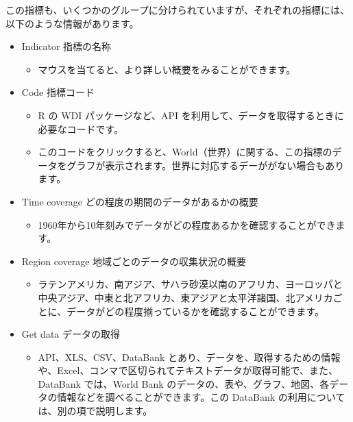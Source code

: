 \documentclass[
  xelatex, ja=standard]{bxjsbook}
\providecommand{\tightlist}{%
  \setlength{\itemsep}{0pt}\setlength{\parskip}{0pt}}
\theoremstyle{definition}
\theoremstyle{definition}
\theoremstyle{definition}
\theoremstyle{definition}
\theoremstyle{remark}
\begin{document}
この指標も、いくつかのグループに分けられていますが、それぞれの指標には、以下のような情報があります。

\begin{itemize}
\item
  Indicator 指標の名称

  \begin{itemize}
  \tightlist
  \item
    マウスを当てると、より詳しい概要をみることができます。
  \end{itemize}
\item
  Code 指標コード

  \begin{itemize}
  \item
    R の WDI パッケージなど、API を利用して、データを取得するときに必要なコードです。
  \item
    このコードをクリックすると、World（世界）に関する、この指標のデータをグラフが表示されます。世界に対応するデーががない場合もあります。
  \end{itemize}
\item
  Time coverage どの程度の期間のデータがあるかの概要

  \begin{itemize}
  \tightlist
  \item
    1960年から10年刻みでデータがどの程度あるかを確認することができます。
  \end{itemize}
\item
  Region coverage 地域ごとのデータの収集状況の概要

  \begin{itemize}
  \tightlist
  \item
    ラテンアメリカ、南アジア、サハラ砂漠以南のアフリカ、ヨーロッパと中央アジア、中東と北アフリカ、東アジアと太平洋諸国、北アメリカごとに、データがどの程度揃っているかを確認することができます。
  \end{itemize}
\item
  Get data データの取得

  \begin{itemize}
  \tightlist
  \item
    API、XLS、CSV、DataBank とあり、データを、取得するための情報や、Excel、コンマで区切られてテキストデータが取得可能で、また、DataBank では、World Bank のデータの、表や、グラフ、地図、各データの情報などを調べることができます。この DataBank の利用については、別の項で説明します。
  \end{itemize}
\end{itemize}
\end{document}
